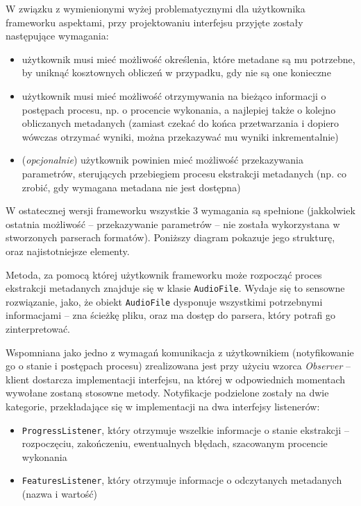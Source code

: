 W związku z wymienionymi wyżej problematycznymi dla użytkownika frameworku aspektami, przy
projektowaniu interfejsu przyjęte zostały następujące wymagania:

\begin{itemize}

  \item użytkownik musi mieć możliwość określenia, które metadane są mu potrzebne, by uniknąć
kosztownych obliczeń w przypadku, gdy nie są one konieczne

  \item użytkownik musi mieć możliwość otrzymywania na bieżąco informacji o postępach procesu, np. o
procencie wykonania, a najlepiej także o kolejno obliczanych metadanych (zamiast czekać do końca
przetwarzania i dopiero wówczas otrzymać wyniki, można przekazywać mu wyniki inkrementalnie)

  \item (\emph{opcjonalnie}) użytkownik powinien mieć możliwość przekazywania parametrów,
sterujących przebiegiem procesu ekstrakcji metadanych (np. co zrobić, gdy wymagana metadana nie jest
dostępna)

\end{itemize}

W ostatecznej wersji frameworku wszystkie 3 wymagania są spełnione (jakkolwiek ostatnia możliwość --
przekazywanie parametrów -- nie została wykorzystana w stworzonych parserach formatów). Poniższy
diagram pokazuje jego strukturę, oraz najistotniejsze elementy.



Metoda, za pomocą której użytkownik frameworku może rozpocząć proces ekstrakcji metadanych znajduje
się w klasie \texttt{AudioFile}. Wydaje się to sensowne rozwiązanie, jako, że obiekt
\texttt{AudioFile} dysponuje wszystkimi potrzebnymi informacjami -- zna ścieżkę pliku, oraz ma
dostęp do parsera, który potrafi go zinterpretować.

Wspomniana jako jedno z wymagań komunikacja z użytkownikiem (notyfikowanie go o stanie i postępach
procesu) zrealizowana jest przy użyciu wzorca \emph{Observer} -- klient dostarcza implementacji
interfejsu, na której w odpowiednich momentach wywołane zostaną stosowne metody. Notyfikacje
podzielone zostały na dwie kategorie, przekładające się w implementacji na dwa interfejsy
listenerów:

\begin{itemize}

  \item \texttt{ProgressListener}, który otrzymuje wszelkie informacje o stanie ekstrakcji --
    rozpoczęciu, zakończeniu, ewentualnych błędach, szacowanym procencie wykonania

  \item \texttt{FeaturesListener}, który otrzymuje informacje o odczytanych metadanych (nazwa i
wartość)

\end{itemize}

